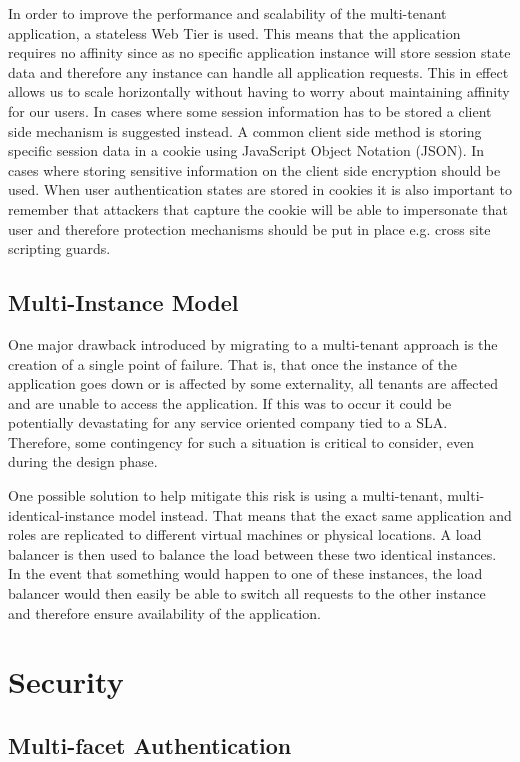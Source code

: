 In order to improve the performance and scalability of the multi-tenant application, a stateless Web Tier is used. This means that the application requires no affinity since as no specific application instance will store session state data and therefore any instance can handle all application requests. This in effect allows us to scale horizontally without having to worry about maintaining affinity for our users. In cases where some session information has to be stored a client side mechanism is suggested instead. A common client side method is storing specific session data in a cookie using JavaScript Object Notation (JSON). In cases where storing sensitive information on the client side encryption should be used. When user authentication states are stored in cookies it is also important to remember that attackers that capture the cookie will be able to impersonate that user and therefore protection mechanisms should be put in place e.g. cross site scripting guards.


\subsection{Multi-Instance Model}

One major drawback introduced by migrating to a multi-tenant approach is the creation of a single point of failure. That is, that once the instance of the application goes down or is affected by some externality, all tenants are affected and are unable to access the application. If this was to occur it could be potentially devastating for any service oriented company tied to a SLA. Therefore, some contingency for such a situation is critical to consider, even during the design phase.
 
One possible solution to help mitigate this risk is using a multi-tenant, multi-identical-instance model instead. That means that the exact same application and roles are replicated to different virtual machines or physical locations. A load balancer is then used to balance the load between these two identical instances. In the event that something would happen to one of these instances, the load balancer would then easily be able to switch all requests to the other instance and therefore ensure availability of the application.


\section{Security}


\subsection{Multi-facet Authentication}


